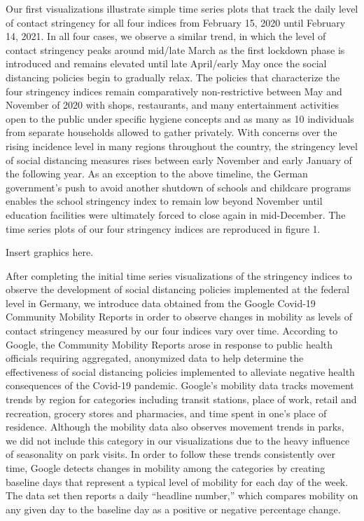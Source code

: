 Our first visualizations illustrate simple time series plots that track the daily level of contact stringency for all four indices from February 15, 2020 until February 14, 2021. In all four cases, we observe a similar trend, in which the level of contact stringency peaks around mid/late March as the first lockdown phase is introduced and remains elevated until late April/early May once the social distancing policies begin to gradually relax. The policies that characterize the four stringency indices remain comparatively non-restrictive between May and November of 2020 with shops, restaurants, and many entertainment activities open to the public under specific hygiene concepts and as many as 10 individuals from separate households allowed to gather privately. With concerns over the rising incidence level in many regions throughout the country, the stringency level of social distancing measures rises between early November and early January of the following year. As an exception to the above timeline, the German government’s push to avoid another shutdown of schools and childcare programs enables the school stringency index to remain low beyond November until education facilities were ultimately forced to close again in mid-December. The time series plots of our four stringency indices are reproduced in figure 1.

Insert graphics here.

After completing the initial time series visualizations of the stringency indices to observe the development of social distancing policies implemented at the federal level in Germany, we introduce data obtained from the Google Covid-19 Community Mobility Reports in order to observe changes in mobility as levels of contact stringency measured by our four indices vary over time. According to Google, the Community Mobility Reports arose in response to public health officials requiring aggregated, anonymized data to help determine the effectiveness of social distancing policies implemented to alleviate negative health consequences of the Covid-19 pandemic. Google’s mobility data tracks movement trends by region for categories including transit stations, place of work, retail and recreation, grocery stores and pharmacies, and time spent in one’s place of residence. Although the mobility data also observes movement trends in parks, we did not include this category in our visualizations due to the heavy influence of seasonality on park visits. In order to follow these trends consistently over time, Google detects changes in mobility among the categories by creating baseline days that represent a typical level of mobility for each day of the week. The data set then reports a daily “headline number,” which compares mobility on any given day to the baseline day as a positive or negative percentage change.

